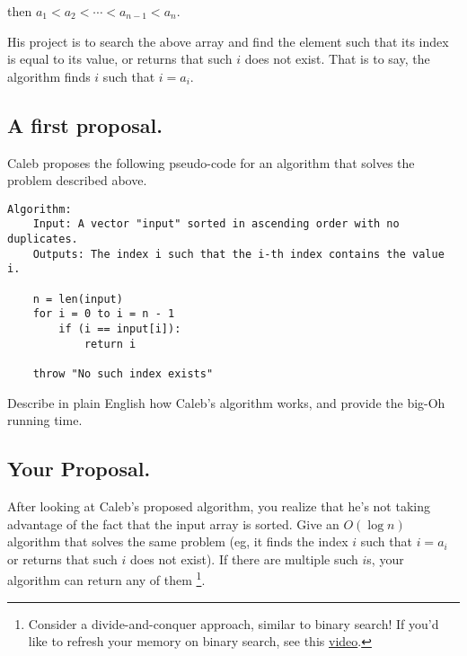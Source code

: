 \documentclass [12pt]{article}
\begin{document}
then $a_1 < a_2 < \cdots < a_{n-1} < a_n$. 

His project is to search the above array and find the element such that its index is equal to its value, or returns that such $i$ does not exist. That is to say, the algorithm finds $i$ such that $i = a_i$.

\subsection{A first proposal. }
\label{subsec:first_proposal}
Caleb proposes the following pseudo-code for an algorithm that solves the problem described above.

\begin{verbatim}
Algorithm:
    Input: A vector "input" sorted in ascending order with no duplicates.
    Outputs: The index i such that the i-th index contains the value i.

    n = len(input)
    for i = 0 to i = n - 1
        if (i == input[i]):
            return i

    throw "No such index exists"
\end{verbatim}

Describe in plain English how Caleb's algorithm works, and provide the big-Oh running time.


\subsection{Your Proposal. }
\label{subsec:second_proposal}
After looking at Caleb's proposed algorithm, you realize that he's not taking advantage of the fact that the input array is sorted. Give an $O(\log n)$ algorithm that solves the same problem (eg, it finds the index $i$ such that $i = a_i$ or returns that such $i$ does not exist). If there are multiple such $i$s, your algorithm can return any of them \footnote{Consider a divide-and-conquer approach, similar to binary search! If you'd like to refresh your memory on binary search, see this \href{https://www.youtube.com/watch?v=P3YID7liBug}{video}.}.

\end{document}
